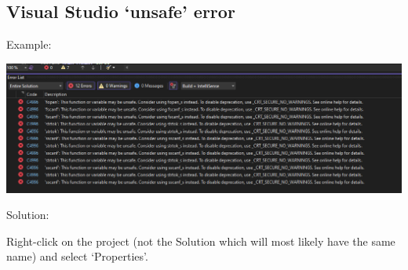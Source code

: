 \documentclass[../en-fa-lab.tex]{subfiles}
\begin{document}
\subsection{Visual Studio `unsafe' error}\label{visual-studio-unsafe-error}

Example:

\includegraphics[width=\textwidth,alt={A screenshot of a computer Description automatically generated}]{./Resources/tutorial_lab9/image8.png}

Solution:

Right-click on the project (not the Solution which will most likely have
the same name) and select `Properties'.
\end{document}
